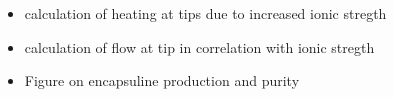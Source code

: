 \begin{itemize}
    \item calculation of heating at tips due to increased ionic stregth
    \item calculation of flow at tip in correlation with ionic stregth
    \item Figure on encapsuline production and purity
\end{itemize}
